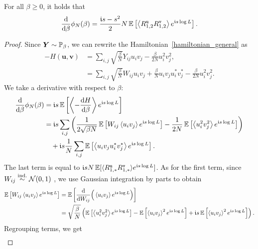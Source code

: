 \documentclass[final,12pt]{colt2018} %
\newcommand{\utt}{\textup{\texttt{u}}}
\newcommand{\vtt}{\textup{\texttt{v}}}
\renewcommand{\u}{\bm{u}}
\renewcommand{\v}{\bm{v}}
\newcommand{\Y}{\bm{Y}}
\begin{document}
\begin{lemma}\label{derivative_phi_planted_lemma} For all $\beta \ge 0$, it holds that
\begin{equation}\label{derivative_phi_planted}
\frac{\rmd}{\rmd \beta} \phi_N(\beta)  = \frac{\imnb s-s^2}{2} N\E\left[\left \langle R^{\utt}_{1,2}R^{\vtt}_{1,2}\right \rangle e^{\imnb s \log L}\right].
\end{equation}
\end{lemma}
\begin{proof}
Since $\Y \sim \P_{\beta}$, we can rewrite the Hamiltonian~\eqref{hamiltonian_general} as
\begin{align*}
-H(\u,\v) &= \sum_{i,j}\sqrt{\frac{\beta}{N}}Y_{ij}u_iv_j - \frac{\beta}{2N} u_i^2v_j^2,\\
&=\sum_{i,j}\sqrt{\frac{\beta}{N}}W_{ij}u_iv_j +\frac{\beta}{N}u_iv_ju_i^*v_j^*- \frac{\beta}{2N} u_i^2v_j^ 2.
\end{align*}
We take a derivative with respect to $\beta$:
\begin{align*}
\frac{\mathrm{d}}{\mathrm{d} \beta} \phi_N(\beta) &= \mathfrak{i} s \operatorname{\mathbb{E}}\left[\left \langle -\frac{\mathrm{d} H}{\mathrm{d} \beta}\right \rangle  e^{\mathfrak{i} s \log L}\right]\\
&=\mathfrak{i} s \sum_{i,j}\left(\frac{1}{2\sqrt{\beta N}} \operatorname{\mathbb{E}}\left[W_{ij}\left \langle u_iv_j \right \rangle  e^{\mathfrak{i} s \log L}\right] 
-\frac{1}{2 N} \operatorname{\mathbb{E}}\left[\left \langle u_i^2v_j^2 \right \rangle  e^{\mathfrak{i} s \log L}\right]  \right)\\
&~~~+\mathfrak{i} s \frac{1}{N} \sum_{i,j} \operatorname{\mathbb{E}}\left[\left \langle u_iv_ju_i^*v_j^ *\right \rangle  e^{\mathfrak{i} s \log L}\right].
\end{align*}
The last term is equal to $\imnb s N  \E[ \langle R^{\utt}_{1,*}R^{\vtt}_{1,*} \rangle  e^{\imnb s \log L}]$. As for the first term, since $W_{ij}\overset{\text{ind.}}{\sim} \mathcal{N}(0,1)$ , we use Gaussian integration by parts to obtain 
\begin{align*}
\operatorname{\mathbb{E}}\left[W_{ij}\left \langle u_iv_j \right \rangle  e^{\mathfrak{i} s \log L}\right] &= \operatorname{\mathbb{E}}\left[\frac{\mathrm{d}}{\mathrm{d} W_{ij}}\Big(\left \langle u_iv_j \right \rangle  e^{\mathfrak{i} s \log L}\Big)\right]\\
&= \sqrt{\frac{\beta}{N}}\left(\operatorname{\mathbb{E}}\left[\left \langle u_i^2v_j^2 \right \rangle  e^{\mathfrak{i} s \log L}\right]
- \operatorname{\mathbb{E}}\left[\left \langle u_iv_j \right \rangle^2  e^{\mathfrak{i} s \log L}\right]+\mathfrak{i} s \operatorname{\mathbb{E}}\left[\left \langle u_iv_j \right \rangle^2  e^{\mathfrak{i} s \log L}\right]\right).
\end{align*}
Regrouping terms, we get
\begin{align}\label{derivative_phi_prime}

\end{align}
\end{proof}
\end{document}
